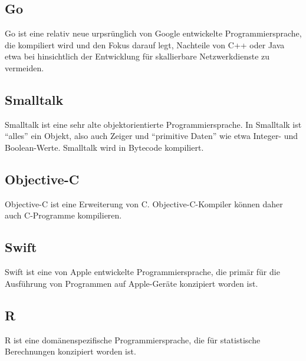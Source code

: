 \begin{multicols}{3}
\subsection{Go}
Go ist eine relativ neue urpsrünglich von Google entwickelte Programmiersprache, die kompiliert wird und den Fokus darauf legt, Nachteile von C++ oder Java etwa bei hinsichtlich der Entwicklung für skallierbare Netzwerkdienste zu vermeiden.
\subsection{Smalltalk}
Smalltalk ist eine sehr alte objektorientierte Programmiersprache. In Smalltalk ist \enquote{alles} ein Objekt, also auch Zeiger und \enquote{primitive Daten} wie etwa Integer- und Boolean-Werte. Smalltalk wird in Bytecode kompiliert.
\subsection{Objective-C}
Objective-C ist eine Erweiterung von C. Objective-C-Kompiler können daher auch C-Programme kompilieren.
\subsection{Swift}
Swift ist eine von Apple entwickelte Programmiersprache, die primär für die Ausführung von Programmen auf Apple-Geräte konzipiert worden ist.
\subsection{R}
R ist eine domänenspezifische Programmiersprache, die für statistische Berechnungen konzipiert worden ist.
\end{multicols}


